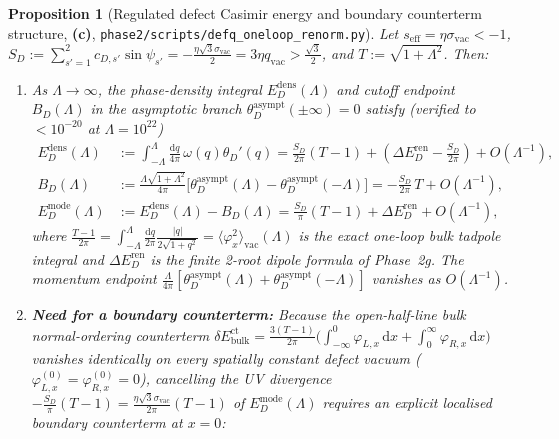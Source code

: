 \documentclass[11pt,a4paper]{article}
\newcommand{\Lc}{\textsf{\textbf{(c)}}}
\newcommand{\dd}{\mathrm{d}}
\newcommand{\sren}{\texttt{phase2/\allowbreak scripts/\allowbreak defq\_\allowbreak oneloop\_\allowbreak renorm.py}}
\newtheorem{proposition}{Proposition}[section]
\theoremstyle{remark}
\begin{document}
\begin{proposition}[Regulated defect Casimir energy and boundary counterterm structure, \Lc, \sren]\label{prop:cutoff_renorm}
Let $s_{\mathrm{eff}} = \eta\sigma_{\mathrm{vac}} < -1$,
$S_D := \sum_{s'=1}^2 c_{D,s'}\sin\psi_{s'} = -\frac{\eta\sqrt{3}\sigma_{\mathrm{vac}}}{2} = 3\eta q_{\mathrm{vac}} > \frac{\sqrt{3}}{2}$,
and $T := \sqrt{1+\Lambda^2}$. Then:
\begin{enumerate}
\item As $\Lambda \to \infty$, the phase-density integral $E_D^{\mathrm{dens}}(\Lambda)$
and cutoff endpoint $B_D(\Lambda)$ in the asymptotic branch $\theta_D^{\mathrm{asympt}}(\pm\infty)=0$
satisfy (verified to $<10^{-20}$ at $\Lambda=10^{22}$)
\begin{align}
  E_D^{\mathrm{dens}}(\Lambda) &:= \int_{-\Lambda}^\Lambda \frac{\dd q}{4\pi}\,\omega(q)\theta_D'(q)
  = \frac{S_D}{2\pi}(T - 1) + \left(\Delta E_D^{\mathrm{ren}} - \frac{S_D}{2\pi}\right) + O(\Lambda^{-1}), \label{eq:ED_dens}\\
  B_D(\Lambda) &:= \frac{\Lambda\sqrt{1+\Lambda^2}}{4\pi}\Big[\theta_D^{\mathrm{asympt}}(\Lambda) - \theta_D^{\mathrm{asympt}}(-\Lambda)\Big]
  = -\frac{S_D}{2\pi}\,T + O(\Lambda^{-1}), \label{eq:BD_end}\\
  E_D^{\mathrm{mode}}(\Lambda) &:= E_D^{\mathrm{dens}}(\Lambda) - B_D(\Lambda)
  = \frac{S_D}{\pi}(T - 1) + \Delta E_D^{\mathrm{ren}} + O(\Lambda^{-1}), \label{eq:ED_mode}
\end{align}
where $\frac{T-1}{2\pi} = \int_{-\Lambda}^\Lambda \frac{\dd q}{2\pi}\frac{|q|}{2\sqrt{1+q^2}} = \langle\varphi_x^2\rangle_{\mathrm{vac}}(\Lambda)$
is the exact one-loop bulk tadpole integral and $\Delta E_D^{\mathrm{ren}}$ is
the finite 2-root dipole formula of Phase~2g. The momentum endpoint
$\frac{\Lambda}{4\pi}[\theta_D^{\mathrm{asympt}}(\Lambda)+\theta_D^{\mathrm{asympt}}(-\Lambda)]$
vanishes as $O(\Lambda^{-1})$.
\item \textbf{Need for a boundary counterterm:} Because the open-half-line bulk
normal-ordering counterterm $\delta E_{\mathrm{bulk}}^{\mathrm{ct}} = \frac{3(T-1)}{2\pi}\big(\int_{-\infty}^0 \varphi_{L,x}\,\dd x + \int_0^\infty \varphi_{R,x}\,\dd x\big)$
vanishes identically on every spatially constant defect vacuum ($\varphi_{L,x}^{(0)}=\varphi_{R,x}^{(0)}=0$),
cancelling the UV divergence $-\frac{S_D}{\pi}(T-1) = \frac{\eta\sqrt{3}\sigma_{\mathrm{vac}}}{2\pi}(T-1)$
of $E_D^{\mathrm{mode}}(\Lambda)$ requires an explicit localised boundary
counterterm at $x=0$:
\begin{equation}\label{eq:delta_ED_ct}

\end{equation}
\end{enumerate}
\end{proposition}
\end{document}
